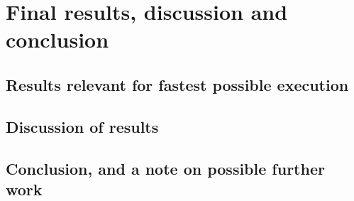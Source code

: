 
\chapter{Final results, discussion and conclusion} %
\label{sec:final_results_discussion_and_conclusion}

\section{Results relevant for fastest possible execution} %
\label{sub:results_relevant_for_fastest_possible_execution}


\section{Discussion of results} %
\label{sub:discussion_of_results}


\section{Conclusion, and a note on possible further work} %
\label{sub:conclusion_and_a_note_on_possible_further_work}


